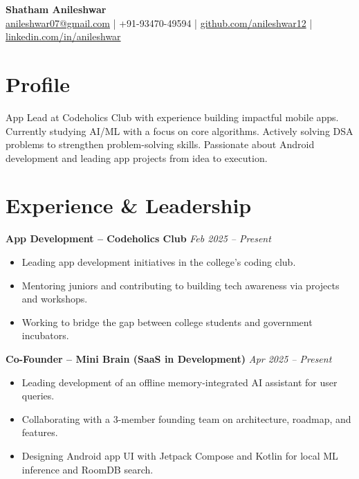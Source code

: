 \documentclass[a4paper,10pt]{article}
\begin{document}
\begin{center}
    {\LARGE \textbf{Shatham Anileshwar}} \\
    \vspace{4pt}
    \small
    \href{mailto:anileshwar7@gmail.com}{anileshwar07@gmail.com} \quad | \quad +91-93470-49594 \quad | \quad
    \href{https://github.com/anileshwar12}{github.com/anileshwar12} \quad | \quad
    \href{https://www.linkedin.com/in/anileshwar/}{linkedin.com/in/anileshwar} \\
\normalsize
\end{center}



\vspace{-1em}
\section*{Profile}
App Lead at Codeholics Club with experience building impactful mobile apps. Currently studying AI/ML with a focus on core algorithms. Actively solving DSA problems to strengthen problem-solving skills. Passionate about Android development and leading app projects from idea to execution.

\section*{Experience \& Leadership}

\textbf{App Development – Codeholics Club} \hfill \textit{Feb 2025 – Present} \\
\begin{itemize}[leftmargin=*, itemsep=1pt]
    \item Leading app development initiatives in the college's coding club.
    \item Mentoring juniors and contributing to building tech awareness via projects and workshops.
    \item Working to bridge the gap between college students and government incubators.
\end{itemize}

\textbf{Co-Founder – Mini Brain (SaaS in Development)} \hfill \textit{Apr 2025 – Present} \\
\begin{itemize}[leftmargin=*, itemsep=1pt]
    \item Leading development of an offline memory-integrated AI assistant for user queries.
    \item Collaborating with a 3-member founding team on architecture, roadmap, and features.
    \item Designing Android app UI with Jetpack Compose and Kotlin for local ML inference and RoomDB search.

\end{itemize}
\end{document}
